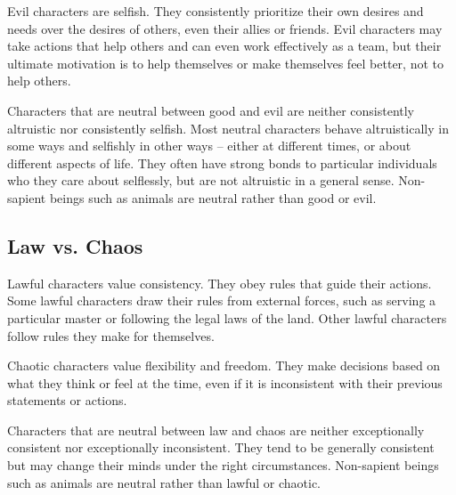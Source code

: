          Evil characters are selfish.
        They consistently prioritize their own desires and needs over the desires of others, even their allies or friends.
        Evil characters may take actions that help others and can even work effectively as a team, but their ultimate motivation is to help themselves or make themselves feel better, not to help others.

         Characters that are neutral between good and evil are neither consistently altruistic nor consistently selfish.
        Most neutral characters behave altruistically in some ways and selfishly in other ways -- either at different times, or about different aspects of life.
        They often have strong bonds to particular individuals who they care about selflessly, but are not altruistic in a general sense.
        Non-sapient beings such as animals are neutral rather than good or evil.

    \subsection{Law vs. Chaos}
         Lawful characters value consistency.
        They obey rules that guide their actions.
        Some lawful characters draw their rules from external forces, such as serving a particular master or following the legal laws of the land.
        Other lawful characters follow rules they make for themselves.

         Chaotic characters value flexibility and freedom.
        They make decisions based on what they think or feel at the time, even if it is inconsistent with their previous statements or actions.

         Characters that are neutral between law and chaos are neither exceptionally consistent nor exceptionally inconsistent.
        They tend to be generally consistent but may change their minds under the right circumstances.
        Non-sapient beings such as animals are neutral rather than lawful or chaotic.

